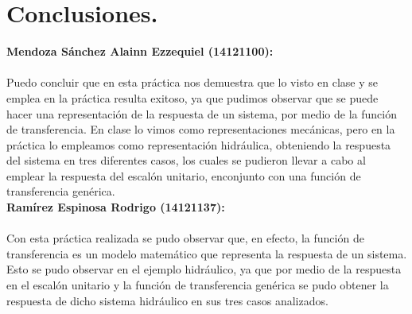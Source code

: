 \documentclass[letterpaper]{article}
\begin{document}
	\newpage
	\section{Conclusiones.}
	
	\textbf{Mendoza Sánchez Alainn Ezzequiel (14121100):}\\\\
		Puedo concluir que en esta práctica nos demuestra que lo visto en clase y se emplea en la práctica resulta exitoso, ya que pudimos observar que se puede hacer una representación de la respuesta de un sistema, por medio de la función de transferencia. En clase lo vimos como representaciones mecánicas, pero en la práctica lo empleamos como representación hidráulica, obteniendo la respuesta del sistema en tres diferentes casos, los cuales se pudieron llevar a cabo al emplear la respuesta del escalón unitario, enconjunto con una función de transferencia genérica.\\
	
	\textbf{Ramírez Espinosa Rodrigo (14121137):}\\\\
		Con esta práctica realizada se pudo observar que, en efecto, la función de transferencia es un modelo matemático que representa la respuesta de un sistema. Esto se pudo observar en el ejemplo hidráulico, ya que por medio de la respuesta en el escalón unitario y la función de transferencia genérica se pudo obtener la respuesta de dicho sistema hidráulico en sus tres casos analizados.
\end{document}

